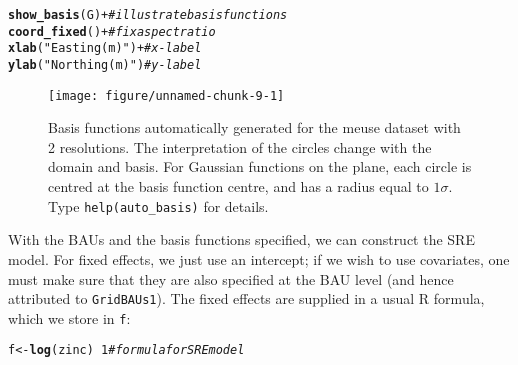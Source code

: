 \documentclass{article}\usepackage[]{graphicx}\usepackage[]{color}
\makeatletter
\newcommand{\hlnum}[1]{\textcolor[rgb]{0.686,0.059,0.569}{#1}}%
\newcommand{\hlstr}[1]{\textcolor[rgb]{0.192,0.494,0.8}{#1}}%
\newcommand{\hlcom}[1]{\textcolor[rgb]{0.678,0.584,0.686}{\textit{#1}}}%
\newcommand{\hlopt}[1]{\textcolor[rgb]{0,0,0}{#1}}%
\newcommand{\hlstd}[1]{\textcolor[rgb]{0.345,0.345,0.345}{#1}}%
\newcommand{\hlkwb}[1]{\textcolor[rgb]{0.69,0.353,0.396}{#1}}%
\newcommand{\hlkwd}[1]{\textcolor[rgb]{0.737,0.353,0.396}{\textbf{#1}}}%
\newenvironment{kframe}{%
 \def\at@end@of@kframe{}%
 \ifinner\ifhmode%
  \def\at@end@of@kframe{\end{minipage}}%
  \begin{minipage}{\columnwidth}%
 \fi\fi%
 \def\FrameCommand##1{\hskip\@totalleftmargin \hskip-\fboxsep
 \colorbox{shadecolor}{##1}\hskip-\fboxsep
     \hskip-\linewidth \hskip-\@totalleftmargin \hskip\columnwidth}%
 \MakeFramed {\advance\hsize-\width
   \@totalleftmargin\z@ \linewidth\hsize
   \@setminipage}}%
 {\par\unskip\endMakeFramed%
 \at@end@of@kframe}
\newenvironment{knitrout}{}{} %
\renewcommand{\tt} {\texttt}
\let\proglang=\textsf
\makeatother
\begin{document}
\begin{knitrout}
\color{fgcolor}\begin{kframe}
\begin{alltt}
\hlkwd{show_basis}\hlstd{(G)} \hlopt{+}             \hlcom{# illustrate basis functions}
    \hlkwd{coord_fixed}\hlstd{()} \hlopt{+}         \hlcom{# fix aspect ratio}
    \hlkwd{xlab}\hlstd{(}\hlstr{"Easting (m)"}\hlstd{)} \hlopt{+}   \hlcom{# x-label}
    \hlkwd{ylab}\hlstd{(}\hlstr{"Northing (m)"}\hlstd{)}    \hlcom{# y-label}
\end{alltt}


{\ttfamily\noindent\itshape\color{messagecolor}{\#\# Note: show\_basis assumes spherical distance functions when plotting}}\end{kframe}\begin{figure}[t]

{\centering \texttt{[image: figure/unnamed-chunk-9-1]} 

}

\caption{Basis functions automatically generated for the meuse dataset with 2 resolutions. The interpretation of the circles change with the domain and basis. For Gaussian functions on the plane, each circle is centred at the basis function centre, and has a radius equal to $1\sigma$. Type \tt{help(auto\_basis)} for details.\label{fig:basis}}\label{fig:unnamed-chunk-9}
\end{figure}


\end{knitrout}

\vspace{0.1in}

 With the BAUs and the basis functions specified, we can construct the SRE model. For fixed effects, we just use an intercept; if we wish to use covariates, one must make sure that they are also specified at the BAU level (and hence attributed to \tt{GridBAUs1}). The fixed effects are supplied in a usual \proglang{R} formula, which we store in \tt{f}:

\begin{knitrout}
\color{fgcolor}\begin{kframe}
\begin{alltt}
\hlstd{f} \hlkwb{<-} \hlkwd{log}\hlstd{(zinc)} \hlopt{~} \hlnum{1}    \hlcom{# formula for SRE model}
\end{alltt}
\end{kframe}
\end{knitrout}
\end{document}
